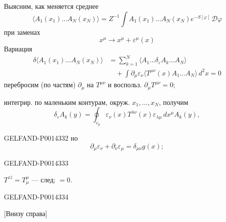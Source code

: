 Выясним, как меняется среднее
\begin{equation*}
\tag{23}
\langle A_1(x_1)\ldots A_N(x_N)\rangle
=Z^{-1}\int A_1(x_1)\ldots A_N(x_N)e^{-S[\varphi]}\,\mathcal D\varphi
\end{equation*}
при заменах
\begin{equation*}
\tag{24}
x^\mu\to x^\mu+\varepsilon^\mu(x)
\end{equation*}
Вариация
\begin{equation*}
\tag{25}
\begin{aligned}
\delta\langle A_1(x_1)\ldots A_N(x_N)\rangle
&=\sum_{k=1}^{N}\langle A_1\ldots\delta_\varepsilon A_k\ldots A_N\rangle\\
&\quad+\int\partial_\mu\varepsilon_\nu
\langle T^{\mu\nu}(x)A_1\ldots A_N\rangle\,d^2x=0
\end{aligned}
\end{equation*}
перебросим (по частям) \(\partial_\mu\) на \(T^{\mu\nu}\) и воспольз.
\(\partial_\mu T^{\mu\nu}=0\);

интегрир. по маленьким контурам, окруж. \(x_1,\ldots,x_N\), получим
\[
\delta_\varepsilon A_k(y)=\oint_{c_y}
\varepsilon_\nu(x)T^{\lambda\nu}(x)\varepsilon_{\lambda\mu}\,dx^\mu A_k(y),
\]
\begin{GelfandAdjacentEvidence}{GELFAND-P001433}{2}
но
\[
\partial_\mu\varepsilon_\nu+\partial_\nu\varepsilon_\mu=\delta_{\mu\nu}g(x);
\]
\end{GelfandAdjacentEvidence}
\begin{GelfandAdjacentEvidence}{GELFAND-P001433}{3}


\(T^{z\bar z}=T^\mu_\mu\) — след; \(=0\).
\end{GelfandAdjacentEvidence}
\begin{GelfandAdjacentEvidence}{GELFAND-P001433}{4}


[Внизу справа]
\end{GelfandAdjacentEvidence}



